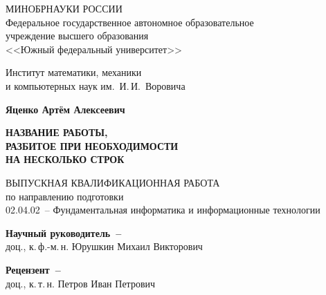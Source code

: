 


\thispagestyle{empty}
\begin{singlespacing}
    \begin{center}

        МИНОБРНАУКИ РОССИИ\\ [12pt]
        Федеральное государственное автономное образовательное\\
        учреждение высшего образования\\
        <<Южный федеральный университет>>

        \vspace{\baselineskip}
        Институт математики, механики\\
        и компьютерных наук им.~И.\,И.~Воровича


        \vfill
        \textbf{Яценко Артём Алексеевич}

        \vspace{15mm}
        {\bf НАЗВАНИЕ РАБОТЫ, \\
            РАЗБИТОЕ ПРИ НЕОБХОДИМОСТИ \\
            НА НЕСКОЛЬКО СТРОК }

        \vspace{15mm}
        ВЫПУСКНАЯ КВАЛИФИКАЦИОННАЯ РАБОТА\\
        по направлению подготовки\\
        02.04.02~-- Фундаментальная информатика и информационные технологии

        \vspace{10mm}
        \textbf{Научный руководитель~--}\\
        доц., к.\,ф.-м.\,н. Юрушкин Михаил Викторович

        \vspace{7mm}
        \textbf{Рецензент~--}\\
        доц., к.\,т.\,н. Петров Иван Петрович



\end{center}
\end{singlespacing}
